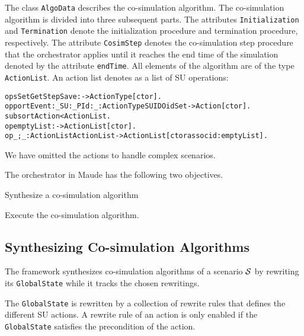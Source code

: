 \normalsize
The class \texttt{AlgoData} describes the co-simulation algorithm.
The co-simulation algorithm is divided into three subsequent parts.
The attributes \texttt{Initialization} and \texttt{Termination} denote the initialization procedure and termination procedure, respectively.
The attribute \texttt{CosimStep} denotes the co-simulation step procedure that the orchestrator applies until it reaches the end time of the simulation denoted by the attribute \texttt{endTime}.
All elements of the algorithm are of the type \texttt{ActionList}.
An action list denotes as a list of SU operations:
\small
\begin{alltt}
ops Set Get Step Save : -> ActionType [ctor] . 
op portEvent:_SU:_PId:_ : ActionType SUID OidSet -> Action [ctor] .
subsort Action < ActionList .
op emptyList : -> ActionList [ctor] .
op _;_ : ActionList ActionList -> ActionList [ctor assoc id: emptyList] .
\end{alltt}
\normalfont
We have omitted the actions to handle complex scenarios.

The orchestrator in Maude has the following two objectives.
\begin{compactenum}
  \item Synthesize a co-simulation algorithm
  \item Execute the co-simulation algorithm.
\end{compactenum}

\subsection{Synthesizing Co-simulation Algorithms}
The framework synthesizes co-simulation algorithms of a scenario $\mathcal{S}$ by rewriting its \texttt{GlobalState} while it tracks the chosen rewritings.

The \texttt{GlobalState} is rewritten by a collection of rewrite rules that defines the different SU actions.
A rewrite rule of an action is only enabled if the \texttt{GlobalState} satisfies the precondition of the action.

